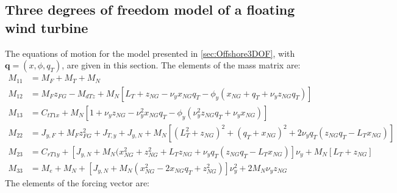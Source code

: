 \documentclass[wes, manuscript]{copernicus}
\renewcommand{\v}[1]{\boldsymbol{#1}}
\begin{document}
\subsection{Three degrees of freedom model of a floating wind turbine}
\label{sec:Offshore3DOFEq}
The equations of motion for the model presented in \autoref{sec:Offshore3DOF}, with $\v{q}=(x,\phi,q_T)$, are given in this section.
The elements of the mass matrix are:
\begin{align}
M_{11} &=M_F + M_T + M_N  
    \\
M_{12} &=  M_{F} z_{FG} - M_{d T z}+ M_N \left[L_T +  z_{NG} - \nu_y x_{NG} q_T -  \phi_y(x_{NG}  +  q_T +   \nu_y z_{NG} q_T ) \right]
\\
M_{13} &=C_{t T 1x} + M_N \left[1 +  \nu_y z_{NG} - \nu_y^{2} x_{NG} q_T - \phi_y (\nu_y^{2} z_{NG}  q_T + \nu_y x_{NG} ) \right]
\\
M_{22} &=
 J_{y,F} + M_F z_{FG}^{2} + J_{T,y} + J_{y,N}
+ M_N\left[ (L_T^2 +z_{NG})^2 + (q_T + x_{NG})^2  + 2 \nu_y q_T(z_{NG} q_T-  L_T x_{NG}) \right] \\
M_{23}&=
C_{r T 1y} + \left[J_{y,N}+M_N(x_{NG}^{2} + z_{NG}^{2} + L_T z_{NG} + \nu_y  q_T(z_{NG} q_T -L_T x_{NG})\right] \nu_y  + M_N\left[L_T + z_{NG}\right]
\\
M_{33} &= M_e + M_N 
+\left[ J_{y,N} + M_N \left(x_{NG}^2 - 2 x_{NG} q_T + z_{NG}^2\right) \right]\nu_y^{2} + 2 M_N \nu_y z_{NG} 
\end{align}
The elements of the forcing vector are:
\end{document}
